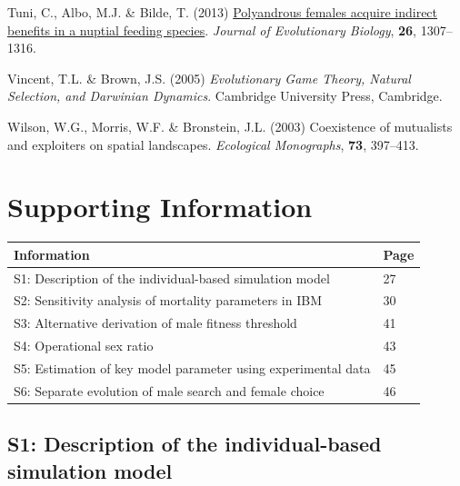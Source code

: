 \documentclass[
]{article}
\newlength{\cslhangindent}
\newlength{\cslentryspacingunit} %
\newenvironment{CSLReferences}[2] %
 {%
  \setlength{\parindent}{0pt}
  \ifodd #1
  \let\oldpar\par
  \def\par{\hangindent=\cslhangindent\oldpar}
  \fi
  \setlength{\parskip}{#2\cslentryspacingunit}
 }%
 {}
\begin{document}
\begin{CSLReferences}{0}{0}
\leavevmode{}%
Tuni, C., Albo, M.J. \& Bilde, T. (2013)
\href{https://doi.org/10.1111/jeb.12137}{{Polyandrous females acquire
indirect benefits in a nuptial feeding species}}. \emph{Journal of
Evolutionary Biology}, \textbf{26}, 1307--1316.

\leavevmode{}%
Vincent, T.L. \& Brown, J.S. (2005) \emph{{Evolutionary Game Theory,
Natural Selection, and Darwinian Dynamics}}. Cambridge University Press,
Cambridge.

\leavevmode{}%
Wilson, W.G., Morris, W.F. \& Bronstein, J.L. (2003) {Coexistence of
mutualists and exploiters on spatial landscapes}. \emph{Ecological
Monographs}, \textbf{73}, 397--413.

\end{CSLReferences}

\clearpage

\hypertarget{supporting-information}{%
\section{Supporting Information}\label{supporting-information}}

\begin{longtable}[]{@{}ll@{}}
\toprule
Information & Page \\
\midrule
\endhead
S1: Description of the individual-based simulation model & 27 \\
S2: Sensitivity analysis of mortality parameters in IBM & 30 \\
S3: Alternative derivation of male fitness threshold & 41 \\
S4: Operational sex ratio & 43 \\
S5: Estimation of key model parameter using experimental data & 45 \\
S6: Separate evolution of male search and female choice & 46 \\
\bottomrule
\end{longtable}

\clearpage

\hypertarget{s1-description-of-the-individual-based-simulation-model}{%
\subsection{S1: Description of the individual-based simulation
model}\label{s1-description-of-the-individual-based-simulation-model}}
\end{document}

